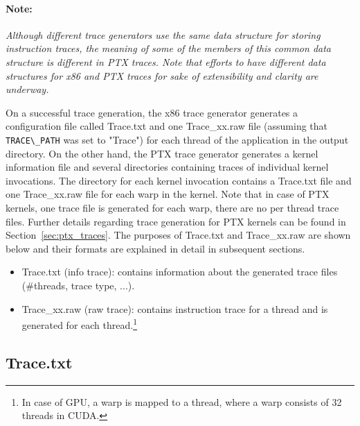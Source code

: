 \paragraph{Note:}

\textit{Although different trace generators use the same data structure for
storing instruction traces, the meaning of some of the members of this
common data structure is different in PTX traces. Note that efforts to
have different data structures for x86 and PTX traces for sake of
extensibility and clarity are underway.}


On a successful trace generation, the x86 trace generator generates a
configuration file called Trace.txt and one Trace\_xx.raw file
(assuming that \Verb+TRACE\_PATH+ was set to "Trace") for each thread
of the application in the output directory. On the other hand, the PTX
trace generator generates a kernel information file and several
directories containing traces of individual kernel invocations. The
directory for each kernel invocation contains a Trace.txt file and one
Trace\_xx.raw file for each warp in the kernel.  Note that in case of
PTX kernels, one trace file is generated for each warp, there are no
per thread trace files. Further details regarding trace generation for
PTX kernels can be found in Section~\ref{sec:ptx_traces}. The purposes
of Trace.txt and Trace\_xx.raw are shown below and their formats are
explained in detail in subsequent sections.


\begin{itemize}\itemsep2pt
\item Trace.txt (info trace): contains information about the generated
  trace files (\#threads, trace type, ...).

\item Trace\_xx.raw (raw trace): contains instruction trace for a
  thread and is generated for each thread.\footnote{In case of GPU, a
    warp is mapped to a \SIM thread, where a warp consists of 32
    threads in CUDA.}
\end{itemize}



\subsection{Trace.txt}


